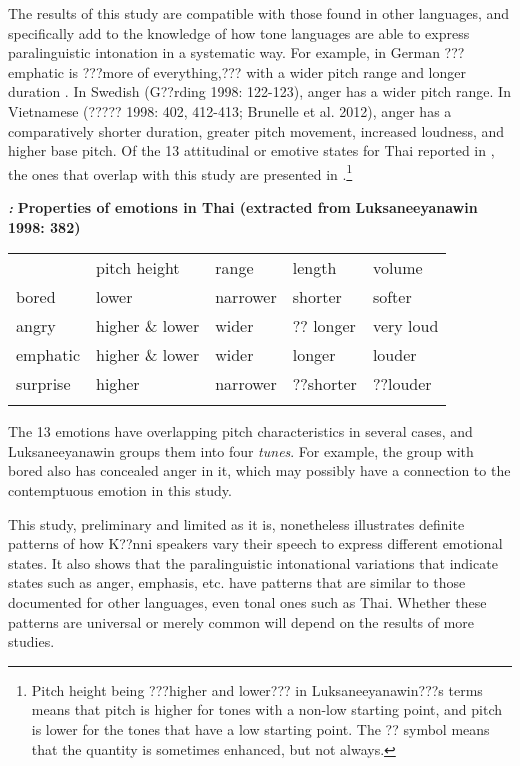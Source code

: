 \documentclass[output=paper]{langsci/langscibook}
\begin{document}
The results of this study are compatible with those found in other languages, and specifically add to the knowledge of how tone languages are able to express paralinguistic intonation in a systematic way. For example, in German ??? emphatic is ???more of everything,??? with a wider pitch range and longer duration \citep[91]{Gibbon1998}.  In Swedish (G??rding 1998: 122-123), anger has a wider pitch range. In Vietnamese (????? 1998: 402, 412-413; Brunelle et al. 2012), anger has a comparatively shorter duration, greater pitch movement, increased loudness, and higher base pitch. Of the 13 attitudinal or emotive states for Thai reported in \citet[382]{Luksaneeyanawin1998}, the ones that overlap with this study are presented in .\footnote{ Pitch height being ???higher and lower??? in Luksaneeyanawin???s terms means that pitch is higher for tones with a non-low starting point, and pitch is lower for the tones that have a low starting point. The ?? symbol means that the quantity is sometimes enhanced, but not always.}

\emph{\textbf{\textup{:}}}\textbf{ Properties of emotions in Thai (extracted from }\textbf{Luksaneeyanawin 1998: 382)}

\begin{tabularx}{\textwidth}{XXXXX} & pitch height & range & length & volume\\
\lsptoprule
bored & lower & narrower & shorter & softer\\
angry & higher \& lower & wider & ?? longer & very loud\\
emphatic & higher \& lower & wider & longer & louder\\
surprise & higher & narrower & ??shorter & ??louder\\
\lspbottomrule
\end{tabularx}
The 13 emotions have overlapping pitch characteristics in several cases, and Luksaneeyanawin groups them into four \emph{tunes}. For example, the group with bored also has concealed anger in it, which may possibly have a connection to the contemptuous emotion in this study.

This study, preliminary and limited as it is, nonetheless illustrates definite patterns of how K??nni speakers vary their speech to express different emotional states. It also shows that the paralinguistic intonational variations that indicate states such as anger, emphasis, etc. have patterns that are similar to those documented for other languages, even tonal ones such as Thai. Whether these patterns are universal or merely common will depend on the results of more studies.
\end{document}
